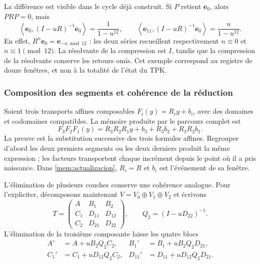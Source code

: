 La différence est visible dans le cycle déjà construit. Si \(P\) retient
\(\mathbf e_0\), alors \(PRP=0\), mais
\begin{equation}
 \left\langle\mathbf e_0,(I-uR)^{-1}\mathbf e_0\right\rangle
 =\frac1{1-u^{12}},\qquad
 \left\langle\mathbf e_{11},(I-uR)^{-1}\mathbf e_0\right\rangle
 =\frac u{1-u^{12}}.
 \label{mem:ejemplo-ciclo}
\end{equation}
En effet, \(R^n\mathbf e_0=\mathbf e_{-n\bmod12}\) : les
deux séries recueillent respectivement \(n\equiv0\) et
\(n\equiv1\pmod{12}\). La résolvante de la compression est \(I\),
tandis que la compression de la résolvante conserve les retours omis.
Cet exemple correspond au registre de douze fenêtres, et non à la totalité
de l'état du TPK.

\subsubsection{Composition des segments et cohérence de la réduction}

Soient trois transports affines composables
\(F_i(y)=R_i y+b_i\), avec des domaines et codomaines compatibles.
La mémoire produite par le parcours complet est
\begin{equation}
 F_3F_2F_1(y)
 =R_3R_2R_1y+b_3+R_3b_2+R_3R_2b_1.
 \label{mem:cociclo-tres}
\end{equation}
La preuve est la substitution successive des trois formules affines.
Regrouper d'abord les deux premiers segments ou les deux derniers produit
la même expression ; les facteurs transportent chaque incrément depuis
le point où il a pris naissance. Dans \eqref{mem:actualizacion},
\(R_i=R\) et \(b_i\) est l'événement de sa fenêtre.

L'élimination de plusieurs couches conserve une cohérence analogue.
Pour l'expliciter, décomposons maintenant
\(V=V_0\oplus V_1\oplus V_2\) et écrivons
\[
 T=\begin{pmatrix}
 A&B_1&B_2\\C_1&D_{11}&D_{12}\\C_2&D_{21}&D_{22}
 \end{pmatrix},\qquad Q_2=(I-uD_{22})^{-1}.
\]
L'élimination de la troisième composante laisse les quatre blocs
\begin{equation}
 \begin{aligned}
 A'&=A+uB_2Q_2C_2,&
 B_1'&=B_1+uB_2Q_2D_{21},\\
 C_1'&=C_1+uD_{12}Q_2C_2,&
 D_{11}'&=D_{11}+uD_{12}Q_2D_{21}.
 \end{aligned}
 \label{mem:schur-intermedio}
\end{equation}

